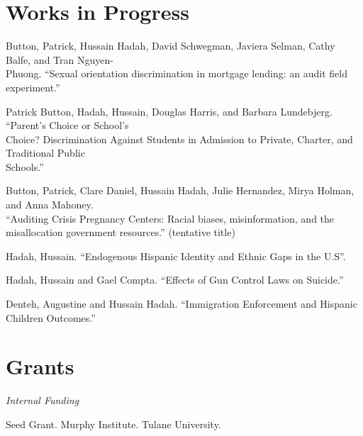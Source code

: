 \documentclass[letterpaper]{article}
\renewenvironment{itemize}{
  \begin{list}{}{
    \setlength{\leftmargin}{1.5em}
  }
}{
  \end{list}
}
\begin{document}
\section*{Works in Progress}
\vspace{2 mm}
\begin{itemize}
\item Button, Patrick, Hussain Hadah, David Schwegman, Javiera Selman, Cathy Balfe, and Tran Nguyen-\\{\makebox[4mm]{\hfill}}Phuong. ``Sexual orientation discrimination in mortgage lending: an audit field experiment.''

\item Patrick Button, Hadah, Hussain, Douglas Harris, and Barbara Lundebjerg. ``Parent’s Choice or School’s \\{\makebox[4mm]{\hfill}} Choice?
Discrimination Against Students in Admission to Private, Charter, and Traditional Public \\{\makebox[4mm]{\hfill}} Schools.''

\item Button, Patrick, Clare Daniel, Hussain Hadah, 
Julie Hernandez, Mirya Holman, and Anna Mahoney. 
\\{\makebox[4mm]{\hfill}}``Auditing Crisis
 Pregnancy Centers: Racial biases, misinformation, 
and the\\{\makebox[4mm]{\hfill}} misallocation government resources.'' (tentative title)

\item Hadah, Hussain. ``Endogenous Hispanic Identity and Ethnic Gaps in the U.S''.
\item Hadah, Hussain and Gael Compta. ``Effects of Gun Control Laws on Suicide.''
\item Denteh, Augustine and Hussain Hadah. ``Immigration Enforcement and Hispanic Children Outcomes.''

\end{itemize}


\section*{Grants}
\vspace{2 mm}
\textit{Internal Funding
}\begin{itemize}
  \item {}Seed Grant. Murphy Institute. Tulane University.
\end{itemize}
\vspace{2 mm}
\end{document}
